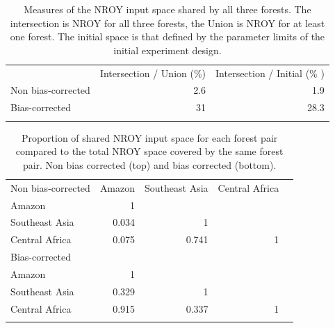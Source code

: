 \documentclass[gmd, manuscript]{copernicus}
\begin{document}
\begin{table}[t]
\caption{Measures of the NROY input space shared by all three forests. The intersection is NROY for all three forests, the Union is NROY for at least one forest. The initial space is that defined by the parameter limits of the initial experiment design.}
\begin{tabular}{lrr}
\tophline

    & Intersection / Union (\%) & Intersection / Initial (\% ) \\
\middlehline
 Non bias-corrected & 2.6 &   1.9 \\
Bias-corrected  & 31 & 28.3 \\
\bottomhline
\end{tabular}
\belowtable{} %
\label{tab:intersection}
\end{table}


\begin{table}[t]
\caption{Proportion of shared NROY input space for each forest pair compared to the total NROY space covered by the same forest pair. Non bias corrected (top) and bias corrected (bottom).}
\begin{tabular}{lrrrr}
\tophline

Non bias-corrected    & Amazon & Southeast Asia & Central Africa  \\
\middlehline
Amazon                &          1        &             &     \\
Southeast Asia      &        0.034  &           1   &    \\
Central Africa         &    0.075 &  0.741  &   1 \\
\bottomhline

\tophline

Bias-corrected      &   &    & \\
\middlehline
Amazon                &          1        &             &     \\
Southeast Asia      &        0.329  &           1   &    \\
Central Africa         &    0.915 & 0.337  &   1 \\
\bottomhline
\end{tabular}
\belowtable{} %
\label{tab:shared_space}
\end{table}
\end{document}

